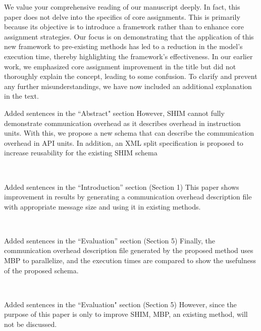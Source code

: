 \documentclass{article}
\begin{document}
\begin{adjustwidth}{1cm}{1cm}  %
We value your comprehensive reading of our manuscript deeply. In fact, this paper does not delve into the specifics of core assignments. This is primarily because its objective is to introduce a framework rather than to enhance core assignment strategies. Our focus is on demonstrating that the application of this new framework to pre-existing methods has led to a reduction in the model's execution time, thereby highlighting the framework's effectiveness. In our earlier work, we emphasized core assignment improvement in the title but did not thoroughly explain the concept, leading to some confusion. To clarify and prevent any further misunderstandings, we have now included an additional explanation in the text.
\end{adjustwidth}
\bigskip
\begin{itembox}[|]{Added sentences in the ``Abstract" section}
However, SHIM cannot fully demonstrate communication overhead as it describes overhead in instruction units. With this, we propose a new schema that can describe the communication overhead in API units. In addition, an XML split specification is proposed to increase reusability for the existing SHIM schema
\end{itembox}\\

\begin{itembox}[|]{Added sentences in the “Introduction” section (Section 1)}
This paper shows improvement in results by generating a communication overhead description file with appropriate message size and using it in existing methods.
\end{itembox}\\

\begin{itembox}[|]{Added sentences in the “Evaluation” section (Section 5)}
Finally, the communication overhead description file generated by the proposed method uses MBP to parallelize, and the execution times are compared to show the usefulness of the proposed schema.
\end{itembox}\\

\begin{itembox}[|]{Added sentences in the ``Evaluation" section (Section 5)}
However, since the purpose of this paper is only to improve SHIM, MBP, an existing method, will not be discussed.
\end{itembox}\\
\end{document}
